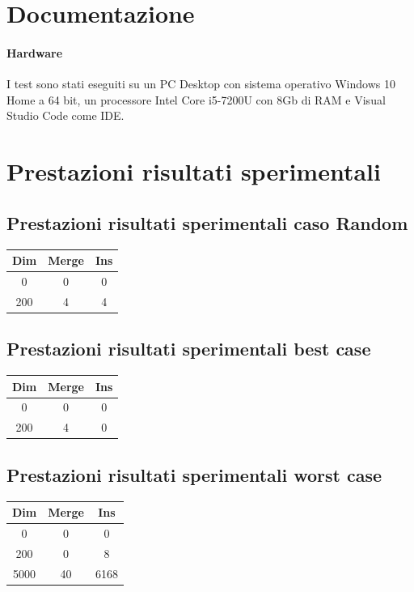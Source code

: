 \documentclass[a4paper,titlepage]{book}
\begin{document}
\section{Documentazione}


\paragraph{Hardware}
I test sono stati eseguiti su un PC Desktop con sistema operativo Windows 10 Home a 64 bit, un processore Intel Core i5-7200U con 8Gb di RAM e Visual Studio Code come IDE.
 
\section{Prestazioni risultati sperimentali}
\subsection{Prestazioni risultati sperimentali caso Random}
\begin{center}
 \begin{tabular}{||c  c c||} 
 \hline
 Dim & Merge  & Ins \\ [0.5ex] 
\hline
0  & 0 & 0 \\
\hline
200 & 4 & 4 \\
\hline
\end{tabular}
\end{center}
\subsection{Prestazioni risultati sperimentali best case}
\begin{center}
 \begin{tabular}{||c  c c||} 
 \hline
 Dim & Merge  & Ins \\ [0.5ex] 
\hline 
0 & 0 & 0 \\
\hline
200 & 4 & 0 \\
\hline
\end{tabular}
\end{center}
\subsection{Prestazioni risultati sperimentali worst case}
\begin{center}
 \begin{tabular}{||c  c c||} 
 \hline
 Dim & Merge & Ins \\ [0.5ex] 
 \hline\hline
 \hline
0 & 0 & 0 \\
\hline
200 & 0 & 8 \\
\hline
5000 & 40 & 6168 \\ 
 \hline
\end{tabular}
\end{center}
\end{document}

